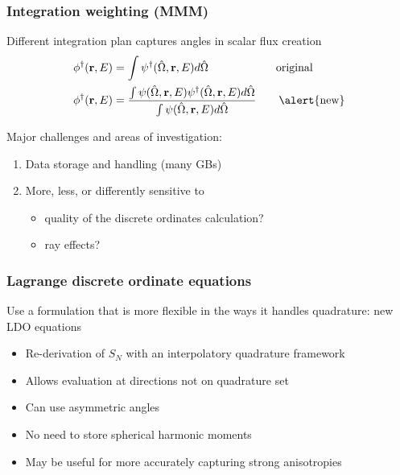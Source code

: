\documentclass[xcolor=x11names,compress, handout]{beamer}
\renewcommand{\(}{\begin{columns}}
\renewcommand{\)}{\end{columns}}
\newcommand{\<}[1]{\begin{column}{#1}}
\renewcommand{\>}{\end{column}}
\newcommand{\vOmega}{\ensuremath{\hat{\Omega}}}
\newcommand{\ve}[1]{\ensuremath{\mathbf{#1}}}
\begin{document}
\begin{frame}[fragile]
  \frametitle{Integration weighting (MMM)}

    Different integration plan captures angles in scalar flux creation	
	\begin{align*}
		\phi^{\dagger}(\ve{r},E) &= \int \psi^{\dagger}(\vOmega, 
		\ve{r},E) d\vOmega \qquad  \qquad \qquad \text{original}\\
		\phi^{\dagger}(\ve{r},E) &= \frac{\int \psi(\vOmega, \ve{r},E)
		 \psi^{\dagger}(\vOmega, \ve{r},E) d\vOmega}{\int \psi(\vOmega, 
		 \ve{r},E)  d\vOmega} \qquad \text{\alert{new}}
	\end{align*}

    \pause
    Major challenges and areas of investigation:
	\begin{enumerate}
	\item Data storage and handling (many GBs)
	\item More, less, or differently sensitive to 
	  \begin{itemize}
	  \item quality of the discrete ordinates calculation?
	  \item ray effects?
	  \end{itemize}
	\end{enumerate}

\end{frame}

\begin{frame}[fragile]
  \frametitle{Lagrange discrete ordinate equations}

    Use a formulation that is more flexible in the ways 
	it handles quadrature: new LDO equations \cite{Ahrens2014}
	\vspace*{1 em}
	
	\begin{itemize}
	\item Re-derivation of $S_N$ with an \alert{interpolatory quadrature framework}
	\item Allows evaluation at directions not on quadrature set
	\item Can use \alert{asymmetric angles}
	\item No need to store spherical harmonic moments
	\item May be useful for more accurately capturing strong anisotropies
	\end{itemize}

\end{frame}
\end{document}
